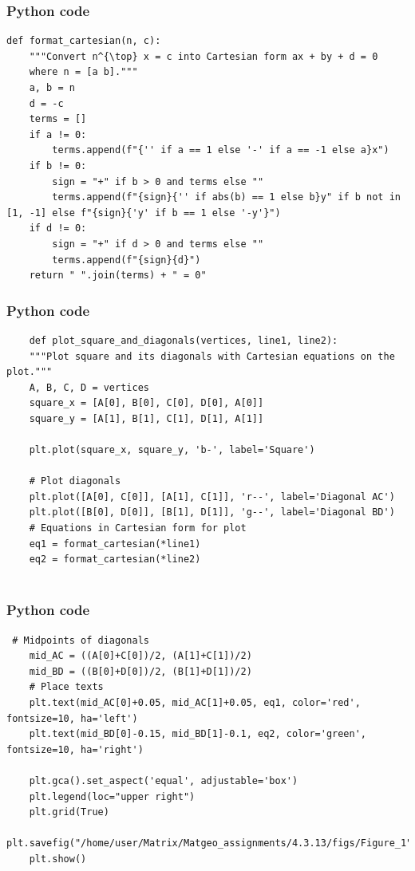 \documentclass{beamer}
\begin{document}
\begin{frame}[fragile]
    \frametitle{Python code}

    \begin{lstlisting}
def format_cartesian(n, c):
    """Convert n^{\top} x = c into Cartesian form ax + by + d = 0
    where n = [a b]."""
    a, b = n
    d = -c
    terms = []
    if a != 0:
        terms.append(f"{'' if a == 1 else '-' if a == -1 else a}x")
    if b != 0:
        sign = "+" if b > 0 and terms else ""
        terms.append(f"{sign}{'' if abs(b) == 1 else b}y" if b not in [1, -1] else f"{sign}{'y' if b == 1 else '-y'}")
    if d != 0:
        sign = "+" if d > 0 and terms else ""
        terms.append(f"{sign}{d}")
    return " ".join(terms) + " = 0"

    \end{lstlisting}
\end{frame}

\begin{frame}[fragile]
    \frametitle{Python code}

    \begin{lstlisting}
    def plot_square_and_diagonals(vertices, line1, line2):
    """Plot square and its diagonals with Cartesian equations on the plot."""
    A, B, C, D = vertices
    square_x = [A[0], B[0], C[0], D[0], A[0]]
    square_y = [A[1], B[1], C[1], D[1], A[1]]
    
    plt.plot(square_x, square_y, 'b-', label='Square')
    
    # Plot diagonals
    plt.plot([A[0], C[0]], [A[1], C[1]], 'r--', label='Diagonal AC')
    plt.plot([B[0], D[0]], [B[1], D[1]], 'g--', label='Diagonal BD')
    # Equations in Cartesian form for plot
    eq1 = format_cartesian(*line1)
    eq2 = format_cartesian(*line2)
   
    \end{lstlisting}
\end{frame}


\begin{frame}[fragile]
    \frametitle{Python code}

    \begin{lstlisting}
 # Midpoints of diagonals
    mid_AC = ((A[0]+C[0])/2, (A[1]+C[1])/2)
    mid_BD = ((B[0]+D[0])/2, (B[1]+D[1])/2)
    # Place texts
    plt.text(mid_AC[0]+0.05, mid_AC[1]+0.05, eq1, color='red', fontsize=10, ha='left')
    plt.text(mid_BD[0]-0.15, mid_BD[1]-0.1, eq2, color='green', fontsize=10, ha='right')
    
    plt.gca().set_aspect('equal', adjustable='box')
    plt.legend(loc="upper right")
    plt.grid(True)
    plt.savefig("/home/user/Matrix/Matgeo_assignments/4.3.13/figs/Figure_1")
    plt.show()
    \end{lstlisting}
\end{frame}
\end{document}
